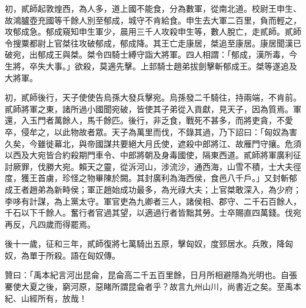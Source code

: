 \begin{pinyinscope}
初，貳師起敦煌西，為人多，道上國不能食，分為數軍，從南北道。校尉王申生、故鴻臚壺充國等千餘人別至郁成，城守不肯給食。申生去大軍二百里，負而輕之，攻郁成急。郁成窺知申生軍少，晨用三千人攻殺申生等，數人脫亡，走貳師。貳師令搜粟都尉上官桀往攻破郁成，郁成降。其王亡走康居，桀追至康居。康居聞漢已破宛，出郁成王與桀。桀令四騎士縛守詣大將軍。四人相謂：「郁成，漢所毒，今生將，卒失大事。」欲殺，莫適先擊。上邽騎士趙弟拔劍擊斬郁成王。桀等遂追及大將軍。

初，貳師後行，天子使使告烏孫大發兵擊宛。烏孫發二千騎往，持兩端，不肯前。貳師將軍之東，諸所過小國聞宛破，皆使其子弟從入貢獻，見天子，因為質焉。軍還，入玉門者萬餘人，馬千餘匹。後行，非乏食，戰死不甚多，而將吏貪，不愛卒，侵牟之，以此物故者眾。天子為萬里而伐，不錄其過，乃下詔曰：「匈奴為害久矣，今雖徙幕北，與帝國謀共要絕大月氏使，遮殺中郎將江、故雁門守攘。危須以西及大宛皆合約殺期門車令、中郎將朝及身毒國使，隔東西道。貳師將軍廣利征討厥罪，伐勝大宛。賴天之靈，從泝河山，涉流沙，通西海，山雪不積，士大夫徑度，獲王首虜，珍怪之物畢陳於闕。其封廣利為海西侯，食邑八千戶。」又封斬郁成王者趙弟為新畤侯；軍正趙始成功最多，為光祿大夫；上官桀敢深入，為少府；李哆有計謀，為上黨太守。軍官吏為九卿者三人，諸侯相、郡守、二千石百餘人，千石以下千餘人。奮行者官過其望，以適過行者皆黜其勞。士卒賜直四萬錢。伐宛再反，凡四歲而得罷焉。

後十一歲，征和三年，貳師復將七萬騎出五原，擊匈奴，度郅居水。兵敗，降匈奴，為單于所殺。語在匈奴傳。

贊曰：「禹本紀言河出昆侖，昆侖高二千五百里餘，日月所相避隱為光明也。自張騫使大夏之後，窮河原，惡睹所謂昆侖者乎？故言九州山川，尚書近之矣。至禹本紀、山經所有，放哉！


\end{pinyinscope}